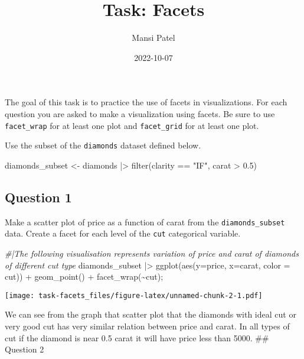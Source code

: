 \documentclass[
]{article}
\title{Task: Facets}
\author{Mansi Patel}
\date{2022-10-07}
\newenvironment{Shaded}{\begin{snugshade}}{\end{snugshade}}
\newcommand{\AttributeTok}[1]{\textcolor[rgb]{0.77,0.63,0.00}{#1}}
\newcommand{\CommentTok}[1]{\textcolor[rgb]{0.56,0.35,0.01}{\textit{#1}}}
\newcommand{\FloatTok}[1]{\textcolor[rgb]{0.00,0.00,0.81}{#1}}
\newcommand{\FunctionTok}[1]{\textcolor[rgb]{0.00,0.00,0.00}{#1}}
\newcommand{\NormalTok}[1]{#1}
\newcommand{\OtherTok}[1]{\textcolor[rgb]{0.56,0.35,0.01}{#1}}
\newcommand{\SpecialCharTok}[1]{\textcolor[rgb]{0.00,0.00,0.00}{#1}}
\newcommand{\StringTok}[1]{\textcolor[rgb]{0.31,0.60,0.02}{#1}}
\begin{document}
\maketitle

The goal of this task is to practice the use of facets in
visualizations. For each question you are asked to make a visualization
using facets. Be sure to use \texttt{facet\_wrap} for at least one plot
and \texttt{facet\_grid} for at least one plot.

Use the subset of the \texttt{diamonds} dataset defined below.

\begin{Shaded}
\begin{Highlighting}[]
\NormalTok{diamonds\_subset }\OtherTok{\textless{}{-}}\NormalTok{ diamonds }\SpecialCharTok{|\textgreater{}} \FunctionTok{filter}\NormalTok{(clarity }\SpecialCharTok{==} \StringTok{"IF"}\NormalTok{, carat }\SpecialCharTok{\textgreater{}} \FloatTok{0.5}\NormalTok{)}
\end{Highlighting}
\end{Shaded}

\hypertarget{question-1}{%
\subsection{Question 1}\label{question-1}}

Make a scatter plot of price as a function of carat from the
\texttt{diamonds\_subset} data. Create a facet for each level of the
\texttt{cut} categorical variable.

\begin{Shaded}
\begin{Highlighting}[]
\CommentTok{\#|The following visualisation represents variation of price and carat of diamonds of different cut type}
\NormalTok{diamonds\_subset }\SpecialCharTok{|\textgreater{}} \FunctionTok{ggplot}\NormalTok{(}\FunctionTok{aes}\NormalTok{(}\AttributeTok{y=}\NormalTok{price, }\AttributeTok{x=}\NormalTok{carat, }\AttributeTok{color =}\NormalTok{ cut)) }\SpecialCharTok{+} \FunctionTok{geom\_point}\NormalTok{() }\SpecialCharTok{+} \FunctionTok{facet\_wrap}\NormalTok{(}\SpecialCharTok{\textasciitilde{}}\NormalTok{cut);}
\end{Highlighting}
\end{Shaded}

\texttt{[image: task-facets\_files/figure-latex/unnamed-chunk-2-1.pdf]}

We can see from the graph that scatter plot that the diamonds with ideal
cut or very good cut has very similar relation between price and carat.
In all types of cut if the diamond is near 0.5 carat it will have price
less than 5000. \#\# Question 2
\end{document}
